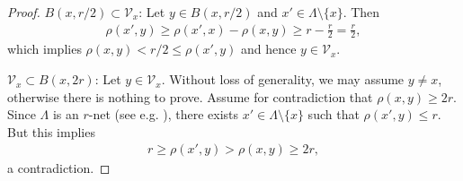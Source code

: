 \documentclass[12pt,reqno]{amsart}
\theoremstyle{definition}
\theoremstyle{remark}
\numberwithin{equation}{section}
\newcommand{\1}{\mathbbm{1}}
\begin{document}
\begin{proof}
  $B(x,r/2)\subset \mathcal{V}_x$:  Let $y\in B(x,r/2)$ and $x'\in\Lambda\setminus\{x\}$. Then 
  \begin{align*}
    \rho(x',y)\geq \rho(x',x)-\rho(x,y)\geq r-\frac{r}{2}=\frac{r}{2},
  \end{align*}
  which implies $\rho(x,y)< r/2 \leq \rho(x',y)$ and hence $y \in\mathcal{V}_{x}$.

 \smallskip
 $\mathcal{V}_x\subset B(x,2r)$: Let $y\in \mathcal{V}_x$. Without loss of generality, we may assume $y\neq x$, otherwise there is nothing to prove. Assume for contradiction that $\rho(x,y)\geq 2r$. Since $\Lambda$ is an $r$-net (see e.g. \cite[Lemma~4.2.6]{Vershynin2018}), there exists $x'\in\Lambda\setminus\{x\}$ such that $\rho(x',y)\leq r$. But this implies
 \begin{align*}
     r\geq \rho(x',y)>\rho(x,y)\geq 2r,
 \end{align*}
 a contradiction.
\end{proof}
\end{document}

